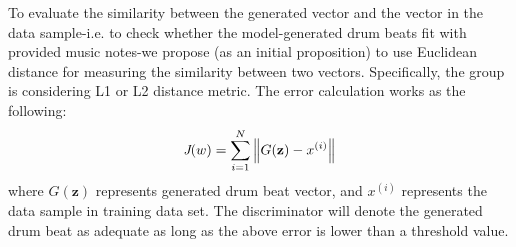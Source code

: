 \usepackage{amsmath}
\newcommand\norm[1]{\left\lVert#1\right\rVert}
\begin{par}
    \par \hspace{15pt} To evaluate the similarity between the generated vector and 
    the vector in the data sample-i.e. to check whether the model-generated drum beats 
    fit with provided music notes-we propose (as an initial proposition) to use Euclidean distance for 
    measuring the similarity between two vectors. Specifically, the group is considering L1 or L2 
    distance metric. The error calculation works as the following: 
    \begin{equation}
        \emph{J}(w) = \sum_{i=1}^{N} \norm{G(\mathbf{z})-x^{(i)}}
        
    \end{equation}
    where $G(\mathbf{z})$ represents generated drum beat vector, and $x^{(i)}$
    represents the data sample in training data set. The discriminator will denote the generated drum 
    beat as adequate as long as the above error is lower than a threshold value.

\end{par}
